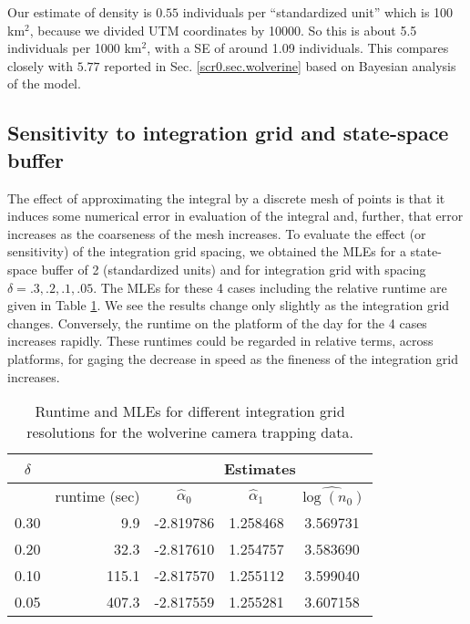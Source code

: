 {\flushleft Our} estimate of density is $0.55$ individuals per ``standardized
unit'' which is 100 km$^2$, because we divided UTM coordinates by
10000.  So this is about 5.5 individuals per 1000 km$^2$,
with a SE of around 1.09
individuals.  This compares closely with $5.77$
reported in
Sec. \ref{scr0.sec.wolverine} based on Bayesian
analysis of the model.


\subsection{Sensitivity to integration grid and state-space buffer}

The effect of approximating the integral by a discrete mesh of points
is that it induces some numerical error in evaluation of the integral
and, further, that error increases as the
coarseness of the mesh increases. 
To evaluate the effect (or sensitivity) of the integration grid
spacing, 
we obtained the MLEs for a state-space buffer of 2 (standardized
units) and for integration grid with spacing $\delta = .3, .2, .1,
.05$. The MLEs for these 4 cases including the relative runtime are
given in Table \ref{mle.tab.integration}.
We see the results change only slightly as the
integration grid changes. Conversely, the runtime on the platform of
the day for the 4 cases increases rapidly. 
These runtimes could be regarded in
relative terms,  across platforms, for gaging the decrease in
speed as the fineness of the integration grid increases.

\begin{table}[ht]
\centering
\caption{Runtime and MLEs for different integration grid resolutions
  for the wolverine camera trapping data.}
\begin{tabular}{crccc}
\hline \hline
$\delta$ &   & \multicolumn{3}{c}{Estimates} \\ \hline
         &  runtime (sec)       & $\hat{\alpha}_0$ & $\hat{\alpha}_1$ &  $\widehat{\log(n_0)}$ \\ \hline
 0.30   &  9.9  &  -2.819786 & 1.258468 & 3.569731  \\
 0.20   & 32.3  &  -2.817610 & 1.254757 & 3.583690 \\
 0.10  & 115.1  &  -2.817570 & 1.255112 & 3.599040 \\
 0.05 &  407.3 &   -2.817559&  1.255281&  3.607158 \\ \hline
\end{tabular}
\label{mle.tab.integration}
\end{table}

